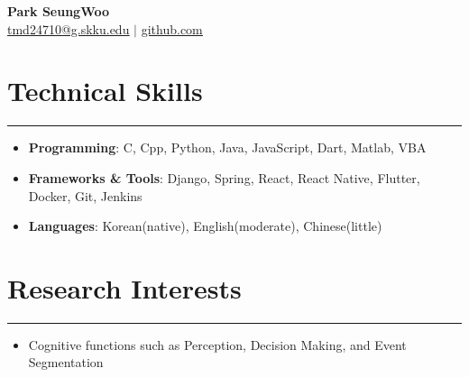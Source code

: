 \documentclass[letterpaper, 10pt]{article}
\begin{document}
\begin{center}
    \textbf{\LARGE Park SeungWoo} \\ \vspace{2pt}
    \href{mailto:tmd24710@g.skku.edu}{\underline{tmd24710@g.skku.edu}} $|$
    \href{https://github.com/Park-SeungWoo}{\underline{github.com}}
\end{center}
\section*{Technical Skills}
\hrule
\vspace{8pt}
\begin{itemize}
    \item[] \textbf{Programming}: C, Cpp, Python, Java, JavaScript, Dart, Matlab, VBA
    \item[] \textbf{Frameworks \& Tools}: Django, Spring, React, React Native, Flutter, Docker, Git, Jenkins
    \item[] \textbf{Languages}: Korean(native), English(moderate), Chinese(little)
\end{itemize}
\section*{Research Interests}
\hrule
\vspace{8pt}
\begin{itemize}
    \item[] Cognitive functions such as Perception, Decision Making, and Event Segmentation
\end{itemize}
\end{document}
